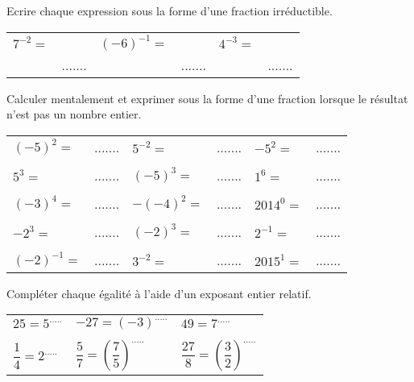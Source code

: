 


\begin{exercice}[]
Ecrire chaque expression sous la forme d'une fraction irréductible.\\

\begin{tabular}{p{}p{}p{1cm}p{}p{1cm}p{}}
$7^{-2}=$ & & \scriptsize $(-6)^{-1}=$ & & $4^{-3}=$ & \\
& ....... & & ....... & & .......\\
\end{tabular}
\end{exercice}
\medskip
\begin{exercice}[]
Calculer mentalement et exprimer sous la forme d'une fraction lorsque le résultat n'est pas un nombre entier.

\renewcommand{\arraystretch}{1.1}
\begin{tabular}{p{}p{}p{1cm}p{}p{1cm}p{}}
$(-5)^2 =$ & ....... & $5^{-2} =$ & ....... & $-5^2 =$ & .......\\
&&&&&\\
$5^3 =$ & ....... & $(-5)^3=$ & ....... & $1^6=$ & .......\\
&&&&&\\
$(-3)^4 =$ & ....... & \scriptsize $-(-4)^2 =$ & ....... & \scriptsize $2014^0 =$ & .......\\
&&&&&\\
$-2^3 =$ & ....... & $(-2)^3 =$ & ....... & $2^{-1} =$ & .......\\
&&&&&\\
\scriptsize $(-2)^{-1} =$ & ....... & $3^{-2} =$ & ....... & \scriptsize $2015^1 =$ & .......\\

\end{tabular}
\end{exercice}
\medskip
\begin{exercice}[]
Compléter chaque égalité à l'aide d'un exposant entier relatif.

\begin{tabular}{p{2cm}p{}p{}}
$25 = 5^{.....}$ & $-27 = (-3)^{.....}$ & $49 = 7^{.....}$\\
&&\\
$\dfrac{1}{4} = 2^{.....}$ & $\dfrac{5}{7} = \left(\dfrac{7}{5}\right)^{.....}$& $\dfrac{27}{8} = \left(\dfrac{3}{2}\right)^{.....}$\\
\end{tabular}
\end{exercice}
